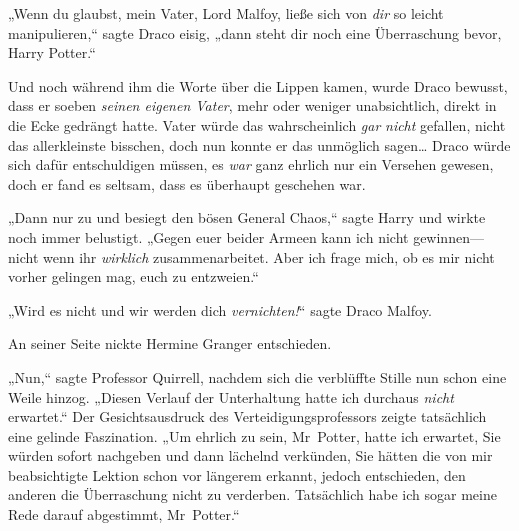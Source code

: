 „Wenn du glaubst, mein Vater, Lord Malfoy, ließe sich von \emph{dir} so leicht manipulieren,“ sagte Draco eisig, „dann steht dir noch eine Überraschung bevor, Harry Potter.“

Und noch während ihm die Worte über die Lippen kamen, wurde Draco bewusst, dass er soeben \emph{seinen eigenen Vater}, mehr oder weniger unabsichtlich, direkt in die Ecke gedrängt hatte. Vater würde das wahrscheinlich \emph{gar} \emph{nicht} gefallen, nicht das allerkleinste bisschen, doch nun konnte er das unmöglich sagen… Draco würde sich dafür entschuldigen müssen, es \emph{war} ganz ehrlich nur ein Versehen gewesen, doch er fand es seltsam, dass es überhaupt geschehen war.

„Dann nur zu und besiegt den bösen General Chaos,“ sagte Harry und wirkte noch immer belustigt. „Gegen euer beider Armeen kann ich nicht gewinnen—nicht wenn ihr \emph{wirklich} zusammenarbeitet. Aber ich frage mich, ob es mir nicht vorher gelingen mag, euch zu entzweien.“

„Wird es nicht und wir werden dich \emph{vernichten!}“ sagte Draco Malfoy.

An seiner Seite nickte Hermine Granger entschieden.

„Nun,“ sagte Professor Quirrell, nachdem sich die verblüffte Stille nun schon eine Weile hinzog. „Diesen Verlauf der Unterhaltung hatte ich durchaus \emph{nicht} erwartet.“ Der Gesichtsausdruck des Verteidigungsprofessors zeigte tatsächlich eine gelinde Faszination. „Um ehrlich zu sein, Mr~Potter, hatte ich erwartet, Sie würden sofort nachgeben und dann lächelnd verkünden, Sie hätten die von mir beabsichtigte Lektion schon vor längerem erkannt, jedoch entschieden, den anderen die Überraschung nicht zu verderben. Tatsächlich habe ich sogar meine Rede darauf abgestimmt, Mr~Potter.“

